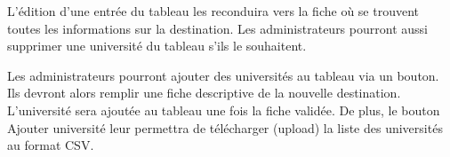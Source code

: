L'édition d'une entrée du tableau les reconduira vers la fiche où se trouvent toutes les informations sur la destination.
Les administrateurs pourront aussi supprimer une université du tableau s'ils le souhaitent.
\bigbreak

Les administrateurs pourront ajouter des universités au tableau via un bouton. Ils devront alors remplir une fiche descriptive de la nouvelle destination. L'université sera ajoutée au tableau une fois la fiche validée. De plus, le bouton \og Ajouter université \fg{} leur permettra de télécharger (upload) la liste des universités au format CSV.
\newpage
 

